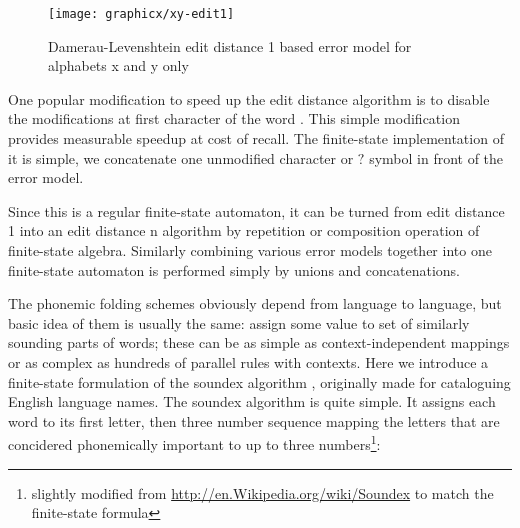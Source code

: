 \documentclass[a4paper,12pt]{article}
\begin{document}
\begin{figure}
    \centering
    \texttt{[image: graphicx/xy-edit1]}
    \caption{Damerau-Levenshtein edit distance 1 based error model for alphabets
        x and y only
    \label{fig:xy-edit-1}}
\end{figure}

One popular modification to speed up the edit distance algorithm is to disable
the modifications at first character of the word \cite{bhagat2007spelling}.
This simple modification provides measurable speedup at cost of recall. The
finite-state implementation of it is simple, we concatenate one unmodified
character or $?$ symbol in front of the error model.

Since this is a regular finite-state automaton, it can be turned from edit
distance 1 into an edit distance n algorithm by repetition or composition
operation of finite-state algebra\cite{pirinen2012effects}. Similarly combining
various error models together into one finite-state automaton is performed
simply by unions and concatenations.

The phonemic folding schemes obviously depend from language to language, but
basic idea of them is usually the same: assign some value to set of similarly
sounding parts of words; these can be as simple as context-independent mappings
or as complex as hundreds of parallel rules with contexts. Here we introduce a
finite-state formulation of the soundex algorithm \cite{russell1918soundex},
originally made for cataloguing English language names. The soundex algorithm
is quite simple. It assigns each word to its first letter, then three number
sequence mapping the letters that are concidered phonemically important to up to
three numbers\footnote{slightly modified from
\url{http://en.Wikipedia.org/wiki/Soundex} to match the finite-state formula}:
\end{document}
